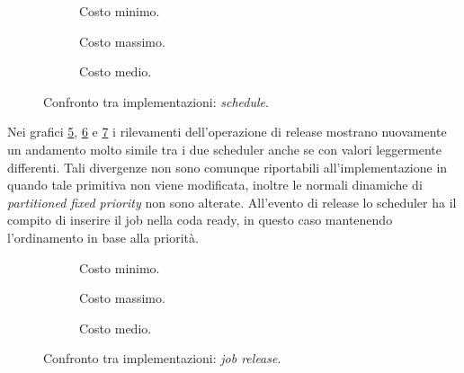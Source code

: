   \begin{figure}[htb]
    \centering
      \begin{subfigure}[b]{0.49\textwidth}
        \centering
        \resizebox{\linewidth}{!}\graficoSchedMIN  
        \caption{Costo minimo.}
        \label{fig:schedMin}
      \end{subfigure}
      \begin{subfigure}[b]{0.49\textwidth}
        \centering
        \resizebox{\linewidth}{!}\graficoSchedMAX
        \caption{Costo massimo.}
        \label{fig:schedMax}
      \end{subfigure}
      \begin{subfigure}[b]{0.49\textwidth}
        \centering
        \resizebox{\linewidth}{!}\graficoSchedAVG
        \caption{Costo medio.}
        \label{fig:schedAvg}
      \end{subfigure}

    \caption{Confronto tra implementazioni: \textit{schedule}.}
    \label{fig:sched}
  \end{figure}

Nei grafici \ref{fig:releaseMin}, \ref{fig:releaseMax} e \ref{fig:releaseAvg} i rilevamenti dell'operazione di release mostrano nuovamente un andamento molto simile tra i due scheduler anche se con valori leggermente differenti. Tali divergenze non sono comunque riportabili all'implementazione in quando tale primitiva non viene modificata, inoltre le normali dinamiche di \textit{partitioned fixed priority} non sono alterate. All'evento di release lo scheduler ha il compito di inserire il job nella coda ready, in questo caso mantenendo l'ordinamento in base alla priorità.\\

  \begin{figure}[htb]
    \centering
      \begin{subfigure}[b]{0.49\textwidth}
        \centering
        \resizebox{\linewidth}{!}\graficoReleaseMIN  
        \caption{Costo minimo.}
        \label{fig:releaseMin}
      \end{subfigure}
      \begin{subfigure}[b]{0.49\textwidth}
        \centering
        \resizebox{\linewidth}{!}\graficoReleaseMAX
        \caption{Costo massimo.}
        \label{fig:releaseMax}
      \end{subfigure}
      \begin{subfigure}[b]{0.49\textwidth}
        \centering
        \resizebox{\linewidth}{!}\graficoReleaseAVG
        \caption{Costo medio.}
        \label{fig:releaseAvg}
      \end{subfigure}

    \caption{Confronto tra implementazioni: \textit{job release}.}
    \label{fig:release}
  \end{figure}
        
